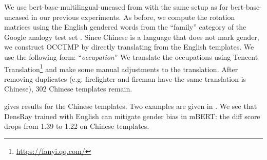 We use  bert-base-multilingual-uncased from
\cite{wolf2019huggingfaces} with the same setup as for
bert-base-uncased in our previous experiments. As before, we
compute the rotation matrices using the English gendered
words from the ``family'' category of the Google analogy
test set \cite{mikolov2013efficient}. Since Chinese is a language that does not mark gender, we construct OCCTMP by directly translating from the English templates. We use the following form:
``\text{[MASK]}\textit{occupation}'' We translate the occupations using Tencent Translation\footnote{\url{https://fanyi.qq.com/}} and make some manual adjustments to the translation. After removing duplicates (e.g. firefighter and fireman have the same translation is Chinese), 302 Chinese templates remain.

 gives results for the Chinese templates. Two examples are given in . We see that DensRay trained with English can mitigate gender bias in mBERT: the diff score drops from 1.39 to 1.22 on Chinese templates. 
